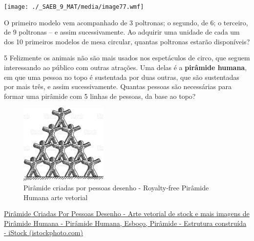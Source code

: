 \begin{escolha}
\begin{boxmedio}
\begin{boxmedio}
{\begin{boxpeq}
\begin{boxpeq}
{\begin{boxpeq}
\begin{boxmedio}
\begin{boxmedio}
\begin{boxpeq}
\begin{boxmedio}
\begin{boxpeq}
\begin{boxpeq}
\begin{boxpeq}
\begin{boxpeq}
\begin{boxmedio}
{\begin{boxmedio}
\begin{boxmedio}
\begin{boxpeq}
\begin{boxmedio}
\begin{boxpeq}
\begin{boxpeq}
\begin{boxpeq}
\begin{escolha}
{\texttt{[image: ./\_SAEB\_9\_MAT/media/image77.wmf]}

O primeiro modelo vem acompanhado de 3 poltronas; o segundo, de 6; o 
terceiro, de 9 poltronas -- e assim sucessivamente. Ao adquirir uma
unidade de cada um dos 10 primeiros modelos de mesa circular, quantas
poltronas estarão disponíveis?

\begin{boxmedio}

\num{5} Felizmente os animais não são mais usados nos espetáculos de circo,
que seguem interessando ao público com outras atrações. Uma delas é a 
\textbf{pirâmide humana}, em que uma pessoa no topo é sustentada por duas
outras, que são sustentadas por mais três, e assim sucessivamente. Quantas
pessoas são necessárias para formar uma pirâmide com 5 linhas de pessoas,
da base ao topo?

\begin{figure}
\centering
\includegraphics[width=1.71354in,height=1.56302in]{./_SAEB_9_MAT/media/image82.jpeg}
\caption{Pirâmide criadas por pessoas desenho - Royalty-free Pirâmide
Humana arte vetorial}
\end{figure}

\href{https://www.istockphoto.com/pt/vetorial/pir\%C3\%A2mide-criadas-por-pessoas-desenho-gm499201238-79908399?phrase=pir\%C3\%A2mide\%20humana}{Pirâmide
Criadas Por Pessoas Desenho - Arte vetorial de stock e mais imagens de
Pirâmide Humana - Pirâmide Humana, Esboço, Pirâmide - Estrutura
construída - iStock (istockphoto.com)}

\begin{boxpeq}



\end{boxpeq}
\end{boxmedio}}
\end{escolha}
\end{boxpeq}
\end{boxpeq}
\end{boxpeq}
\end{boxmedio}
\end{boxpeq}
\end{boxmedio}
\end{boxmedio}}
\end{boxmedio}
\end{boxpeq}
\end{boxpeq}
\end{boxpeq}
\end{boxpeq}
\end{boxmedio}
\end{boxpeq}
\end{boxmedio}
\end{boxmedio}
\end{boxpeq}}
\end{boxpeq}
\end{boxpeq}}
\end{boxmedio}
\end{boxmedio}
\end{escolha}
